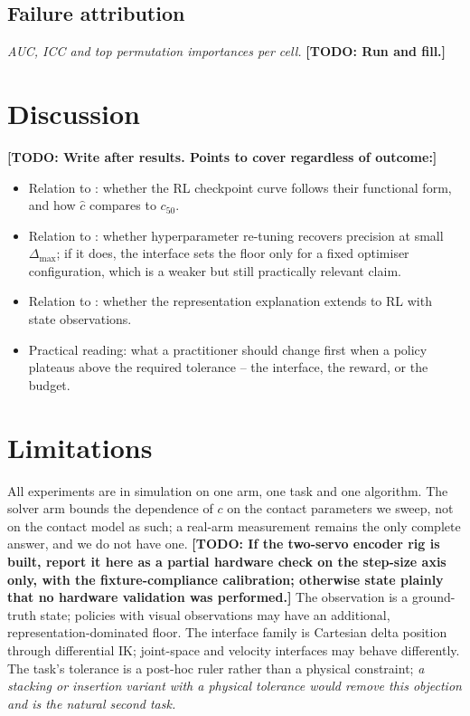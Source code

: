 \documentclass{article}
\newcommand{\todo}[1]{{\color{red}\textbf{[TODO: #1]}}}
\newcommand{\planned}[1]{{\color{blue!70!black}\textit{#1}}}
\newcommand{\dmax}{\Delta_{\max}}
\begin{document}
\subsection{Failure attribution}
\planned{AUC, ICC and top permutation importances per cell.}
\todo{Run and fill.}

\section{Discussion}
\label{sec:discussion}

\todo{Write after results. Points to cover regardless of outcome:}
\begin{itemize}[nosep,leftmargin=*]
\item Relation to \citet{xu2026curse}: whether the RL checkpoint curve follows their functional form, and how $\hat c$ compares to $c_{50}$.
\item Relation to \citet{bronars2026tune}: whether hyperparameter re-tuning recovers precision at small $\dmax$; if it does, the interface sets the floor only for a fixed optimiser configuration, which is a weaker but still practically relevant claim.
\item Relation to \citet{gyenes2026fourier}: whether the representation explanation extends to RL with state observations.
\item Practical reading: what a practitioner should change first when a policy plateaus above the required tolerance -- the interface, the reward, or the budget.
\end{itemize}

\section{Limitations}
\label{sec:limitations}

All experiments are in simulation on one arm, one task and one algorithm. The solver arm bounds the dependence of $c$ on the contact parameters we sweep, not on the contact model as such; a real-arm measurement remains the only complete answer, and we do not have one. \todo{If the two-servo encoder rig is built, report it here as a partial hardware check on the step-size axis only, with the fixture-compliance calibration; otherwise state plainly that no hardware validation was performed.} The observation is a ground-truth state; policies with visual observations may have an additional, representation-dominated floor. The interface family is Cartesian delta position through differential IK; joint-space and velocity interfaces \citep{aljalbout2024role,azimi2026benchmarking} may behave differently. The task's tolerance is a post-hoc ruler rather than a physical constraint; \planned{a stacking or insertion variant with a physical tolerance would remove this objection and is the natural second task.}
\end{document}
